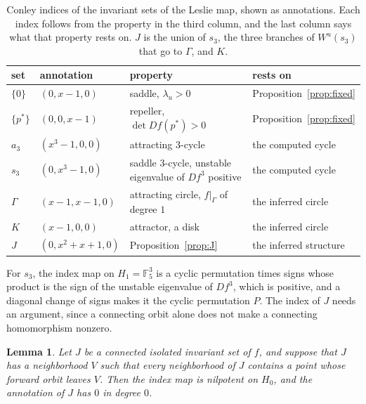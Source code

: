 \documentclass[11pt]{article}
\theoremstyle{plain}
\newtheorem{lemma}[proposition]{Lemma}
\theoremstyle{definition}
\theoremstyle{remark}
\newcommand{\F}{\mathbb{F}_5}
\begin{document}
\begin{table}[tbp]
\centering
\caption{Conley indices of the invariant sets of the Leslie map, shown as annotations. Each index follows from the property in the third column, and the last column says what that property rests on. $J$ is the union of $s_3$, the three branches of $W^u(s_3)$ that go to $\Gamma$, and $K$.}\label{tab:expected}
\small
\begin{tabular}{llll}
\toprule
set & annotation & property & rests on \\
\midrule
$\{0\}$ & $(0,x-1,0)$ & saddle, $\lambda_u>0$ & Proposition~\ref{prop:fixed} \\
$\{p^*\}$ & $(0,0,x-1)$ & repeller, $\det Df(p^*)>0$ & Proposition~\ref{prop:fixed} \\
$a_3$ & $(x^3-1,0,0)$ & attracting $3$-cycle & the computed cycle \\
$s_3$ & $(0,x^3-1,0)$ & saddle $3$-cycle, unstable eigenvalue of $Df^3$ positive & the computed cycle \\
$\Gamma$ & $(x-1,x-1,0)$ & attracting circle, $f|_\Gamma$ of degree $1$ & the inferred circle \\
$K$ & $(x-1,0,0)$ & attractor, a disk & the inferred circle \\
$J$ & $(0,x^2+x+1,0)$ & Proposition~\ref{prop:J} & the inferred structure \\
\bottomrule
\end{tabular}
\end{table}

For $s_3$, the index map on $H_1=\F^3$ is a cyclic permutation times signs whose product is the sign of the unstable eigenvalue of $Df^3$, which is positive, and a diagonal change of signs makes it the cyclic permutation $P$. The index of $J$ needs an argument, since a connecting orbit alone does not make a connecting homomorphism nonzero.

\begin{lemma}\label{lem:H0}
Let $J$ be a connected isolated invariant set of $f$, and suppose that $J$ has a neighborhood $V$ such that every neighborhood of $J$ contains a point whose forward orbit leaves $V$. Then the index map is nilpotent on $H_0$, and the annotation of $J$ has $0$ in degree $0$.
\end{lemma}
\end{document}
